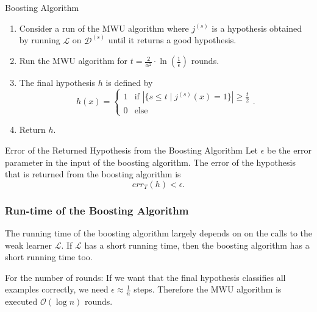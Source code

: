 \documentclass[english]{panikzettel}
\begin{document}
\begin{halfboxl}
\vspace{-\baselineskip}
\begin{algo}{Boosting Algorithm}
\begin{enumerate}
\item Consider a run of the MWU algorithm where $j^{(s)}$ is a hypothesis obtained by running $\mathcal{L}$ on $\mathcal{D}^{(s)}$ until it returns a good hypothesis.
\item Run the MWU algorithm for $t=\frac{2}{\alpha^2}\cdot \ln(\frac{1}{\epsilon})$ rounds.
\item The final hypothesis $h$ is defined by
\[
h(x)=
\begin{cases}
1 & \text{if } |\{s\leq t\mid j^{(s)}(x)=1 \}|\geq \frac{t}{2}\\
0 & \text{else}
\end{cases}
.
\]
\item Return $h$.
\end{enumerate}
\end{algo}

\end{halfboxl}
\begin{halfboxr}
\vspace{-\baselineskip}
\begin{theo}{Error of the Returned Hypothesis from the Boosting Algorithm}
Let $\epsilon$ be the error parameter in the input of the boosting algorithm. The error of the hypothesis that is returned from the boosting algorithm is
\[
err_T(h)<\epsilon.
\]
\end{theo}
\end{halfboxr}

\subsubsection{Run-time of the Boosting Algorithm}
The running time of the boosting algorithm largely depends on on the calls to the weak learner $\mathcal{L}$. If $\mathcal{L}$ has a short running time, then the boosting algorithm has a short running time too.

For the number of rounds: If we want that the final hypothesis classifies all examples correctly, we need $\epsilon\approx\frac{1}{n}$ steps. Therefore the MWU algorithm is executed $\mathcal{O}(\log n)$ rounds.
\end{document}
